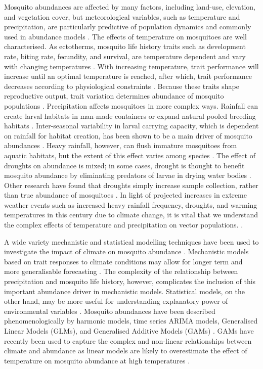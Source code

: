 Mosquito abundances are affected by many factors, including land-use, elevation, and vegetation cover, but meteorological variables, such as temperature and precipitation, are particularly predictive of population dynamics and commonly used in abundance models \citep{Trawinski2008, Li2019, Wang2011, Yoo2016}. The effects of temperature on mosquitoes are well characterised. As ectotherms, mosquito life history traits such as development rate, biting rate, fecundity, and survival, are temperature dependent and vary with changing temperatures \citep{Mordecai2019}. With increasing temperature, trait performance will increase until an optimal temperature is reached, after which, trait performance decreases according to physiological constraints \citep{Amarasekare2012}. Because these traits shape reproductive output, trait variation determines abundance of mosquito populations \citep{Cator2020}. Precipitation affects mosquitoes in more complex ways. Rainfall can create larval habitats in man-made containers or expand natural pooled breeding habitats \citep{Keith2005, Koenraadt2008}. Inter-seasonal variability in larval carrying capacity, which is dependent on rainfall for habitat creation, has been shown to be a main driver of mosquito abundances \citep{Marini2016}. Heavy rainfall, however, can flush immature mosquitoes from aquatic habitats, but the extent of this effect varies among species \citep{Koenraadt2008, Paaijmans2007}. The effect of droughts on abundance is mixed; in some cases, drought is thought to benefit mosquito abundance by eliminating predators of larvae in drying water bodies \citep{Chase2003}. Other research have found that droughts simply increase sample collection, rather than true abundance of mosquitoes \citep{Shaman2002}. In light of projected increases in extreme weather events such as increased heavy rainfall frequency, droughts, and warming temperatures in this century due to climate change, it is vital that we understand the complex effects of temperature and precipitation on vector populations. \citep{Seneviratne2012}.

A wide variety mechanistic and statistical modelling techniques have been used to investigate the impact of climate on mosquito abundance \citep{Ahumada2004, Cailly2012, Jian2014, Yoo2016, Wang2011}. Mechanistic models based on trait responses to climate conditions may allow for longer term and more generalisable forecasting \citep{Cator2020}. The complexity of the relationship between precipitation and mosquito life history, however, complicates the inclusion of this important abundance driver in mechanistic models. Statistical models, on the other hand, may be more useful for understanding  explanatory power of environmental variables \citep{Mordecai2019}. Mosquito abundances have been described phenomenologically by harmonic models, time series ARIMA models, Generalised Linear Models (GLMs), and Generalised Additive Models (GAMs) \citep{Li2019, Trawinski2008, Wang2011, Yoo2016}. GAMs have recently been used to capture the complex and non-linear relationships between climate and abundance as linear models are likely to overestimate the effect of temperature on mosquito abundance at high temperatures \citep{Li2019, Roiz2014, Xu2017}. 

